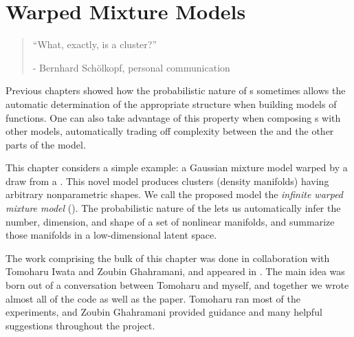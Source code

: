 
\inbpdocument

\chapter{Warped Mixture Models}
\label{ch:warped}

\begin{quotation}
``What, exactly, is a cluster?''

\hspace*{\fill} - Bernhard Sch\"{o}lkopf, personal communication
\end{quotation}

Previous chapters showed how the probabilistic nature of \gp{}s sometimes allows the automatic determination of the appropriate structure when building models of functions.
One can also take advantage of this property when composing \gp{}s with other models, automatically trading off complexity between the \gp{} and the other parts of the model.

This chapter considers a simple example: a Gaussian mixture model warped by a draw from a \gp{}.
This novel model produces clusters (density manifolds) having arbitrary nonparametric shapes.
We call the proposed model the \emph{infinite warped mixture model} (\iwmm{}).
The probabilistic nature of the \iwmm{} lets us automatically infer the number, dimension, and shape of a set of nonlinear manifolds, and summarize those manifolds in a low-dimensional latent space.





The work comprising the bulk of this chapter was done in collaboration with Tomoharu Iwata and Zoubin Ghahramani, and appeared in \citet{IwaDuvGha12}.
The main idea was born out of a conversation between Tomoharu and myself, and together we wrote almost all of the code as well as the paper.
Tomoharu ran most of the experiments, and Zoubin Ghahramani provided guidance and many helpful suggestions throughout the project.




